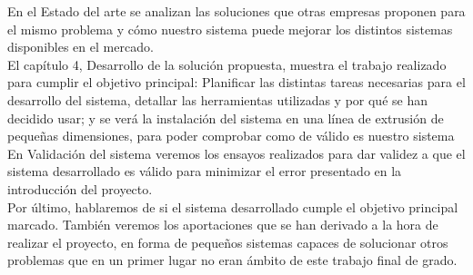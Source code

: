 En el Estado del arte se analizan las soluciones que otras empresas proponen para el mismo problema y cómo nuestro sistema puede mejorar los distintos sistemas disponibles en el mercado.\\

El capítulo 4, Desarrollo de la solución propuesta, muestra el trabajo realizado para cumplir el objetivo principal: Planificar las distintas tareas necesarias para el desarrollo del sistema, detallar las herramientas utilizadas y por qué se han decidido usar; y se verá la instalación del sistema en una línea de extrusión de pequeñas dimensiones, para poder comprobar como de válido es nuestro sistema\\

En Validación del sistema veremos los ensayos realizados para dar validez a que el sistema desarrollado es válido para minimizar el error presentado en la introducción del proyecto.\\

Por último, hablaremos de si el sistema desarrollado cumple el objetivo principal marcado. También veremos los aportaciones que se han derivado a la hora de realizar el proyecto, en forma de pequeños sistemas capaces de solucionar otros problemas que en un primer lugar no eran ámbito de este trabajo final de grado.